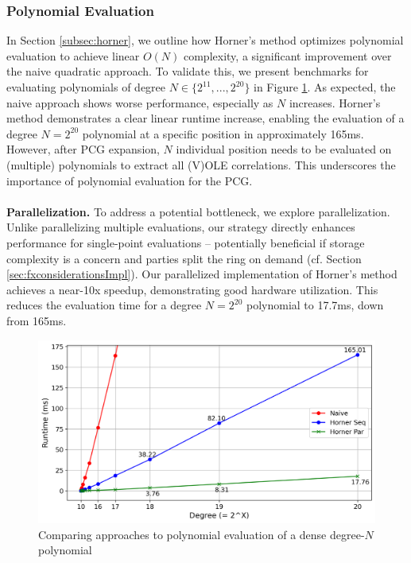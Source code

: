 \subsubsection{Polynomial Evaluation}
In Section \ref{subsec:horner}, we outline how Horner's method optimizes polynomial evaluation to achieve linear $O(N)$ complexity, a significant improvement over the naive quadratic approach. To validate this, we present benchmarks for evaluating polynomials of degree $N \in \{2^{11}, ..., 2^{20}\}$ in Figure \ref{fig:polyEvalBench}. As expected, the naive approach shows worse performance, especially as $N$ increases. Horner's method demonstrates a clear linear runtime increase, enabling the evaluation of a degree $N=2^{20}$ polynomial at a specific position in approximately 165ms. However, after PCG expansion, $N$ individual position needs to be evaluated on (multiple) polynomials to extract all (V)OLE correlations. This underscores the importance of polynomial evaluation for the PCG.
\\\\
\textbf{Parallelization.} To address a potential bottleneck, we explore parallelization. Unlike parallelizing multiple evaluations, our strategy directly enhances performance for single-point evaluations – potentially beneficial if storage complexity is a concern and parties split the ring on demand (cf. Section \ref{sec:fxconsiderationsImpl}). Our parallelized implementation of Horner's method achieves a near-10x speedup, demonstrating good hardware utilization. This reduces the evaluation time for a degree $N=2^{20}$ polynomial to 17.7ms, down from 165ms.

\begin{figure}[t]
    \centering
    \includegraphics[scale=0.49]{images/plots/poly_eval.png}
    \caption{Comparing approaches to polynomial evaluation of a dense degree-$N$ polynomial}
    \label{fig:polyEvalBench}
\end{figure}


